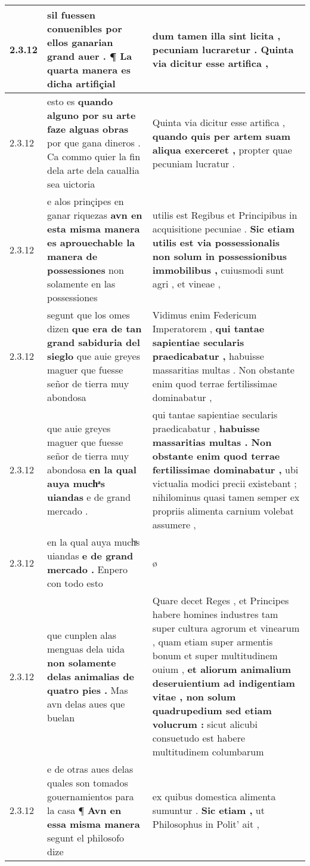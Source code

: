 \begin{tabular}{|p{1cm}|p{6.5cm}|p{6.5cm}|}
2.3.12 & sil fuessen conuenibles \textbf{ por ellos ganarian grand auer . } ¶ La quarta manera es dicha artifiçial & dum tamen illa sint licita , \textbf{ pecuniam lucraretur . } Quinta via dicitur esse artifica , \\\hline
2.3.12 & esto es \textbf{ quando alguno por su arte faze alguas obras } por que gana dineros . Ca commo quier la fin dela arte dela caualłia sea uictoria & Quinta via dicitur esse artifica , \textbf{ quando quis per artem suam aliqua exerceret , } propter quae pecuniam lucratur . \\\hline
2.3.12 & e alos prinçipes en ganar riquezas \textbf{ avn en esta misma manera es aprouechable la manera de possessiones } non solamente en las possessiones & utilis est Regibus et Principibus in acquisitione pecuniae . \textbf{ Sic etiam utilis est via possessionalis non solum in possessionibus immobilibus , } cuiusmodi sunt agri , et vineae , \\\hline
2.3.12 & segunt que los omes dizen \textbf{ que era de tan grand sabiduria del sieglo } que auie greyes maguer que fuesse señor de tierra muy abondosa & Vidimus enim Federicum Imperatorem , \textbf{ qui tantae sapientiae secularis praedicabatur , } habuisse massaritias multas . Non obstante enim quod terrae fertilissimae dominabatur , \\\hline
2.3.12 & que auie greyes maguer que fuesse señor de tierra muy abondosa \textbf{ en la qual auya muchͣs uiandas } e de grand mercado . & qui tantae sapientiae secularis praedicabatur , \textbf{ habuisse massaritias multas . Non obstante enim quod terrae fertilissimae dominabatur , } ubi victualia modici precii existebant ; nihilominus quasi tamen semper ex propriis alimenta carnium volebat assumere , \\\hline
2.3.12 & en la qual auya muchͣs uiandas \textbf{ e de grand mercado . } Enpero con todo esto & ø \\\hline
2.3.12 & que cunplen alas menguas dela uida \textbf{ non solamente delas animalias de quatro pies . } Mas avn delas aues que buelan & Quare decet Reges , et Principes habere homines industres tam super cultura agrorum et vinearum , quam etiam super armentis bonum et super multitudinem ouium , \textbf{ et aliorum animalium deseruientium ad indigentiam vitae , non solum quadrupedium sed etiam volucrum : } sicut alicubi consuetudo est habere multitudinem columbarum \\\hline
2.3.12 & e de otras aues delas quales son tomados gouernamientos para la casa ¶ \textbf{ Avn en essa misma manera } segunt el philosofo dize & ex quibus domestica alimenta sumuntur . \textbf{ Sic etiam , } ut Philosophus in Polit’ ait , \\\hline

\end{tabular}
